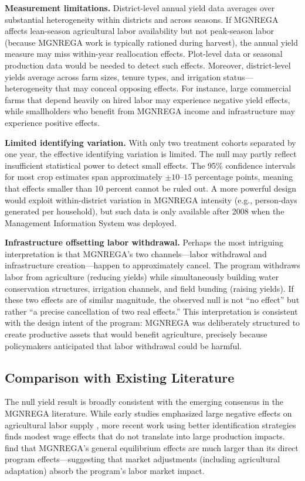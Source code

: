 \documentclass[12pt]{article}
\begin{document}
\textbf{Measurement limitations.} District-level annual yield data averages over substantial heterogeneity within districts and across seasons. If MGNREGA affects lean-season agricultural labor availability but not peak-season labor (because MGNREGA work is typically rationed during harvest), the annual yield measure may miss within-year reallocation effects. Plot-level data or seasonal production data would be needed to detect such effects. Moreover, district-level yields average across farm sizes, tenure types, and irrigation status---heterogeneity that may conceal opposing effects. For instance, large commercial farms that depend heavily on hired labor may experience negative yield effects, while smallholders who benefit from MGNREGA income and infrastructure may experience positive effects.

\textbf{Limited identifying variation.} With only two treatment cohorts separated by one year, the effective identifying variation is limited. The null may partly reflect insufficient statistical power to detect small effects. The 95\% confidence intervals for most crop estimates span approximately $\pm 10$--$15$ percentage points, meaning that effects smaller than 10 percent cannot be ruled out. A more powerful design would exploit within-district variation in MGNREGA intensity (e.g., person-days generated per household), but such data is only available after 2008 when the Management Information System was deployed.

\textbf{Infrastructure offsetting labor withdrawal.} Perhaps the most intriguing interpretation is that MGNREGA's two channels---labor withdrawal and infrastructure creation---happen to approximately cancel. The program withdraws labor from agriculture (reducing yields) while simultaneously building water conservation structures, irrigation channels, and field bunding (raising yields). If these two effects are of similar magnitude, the observed null is not ``no effect'' but rather ``a precise cancellation of two real effects.'' This interpretation is consistent with the design intent of the program: MGNREGA was deliberately structured to create productive assets that would benefit agriculture, precisely because policymakers anticipated that labor withdrawal could be harmful.

\subsection{Comparison with Existing Literature}

The null yield result is broadly consistent with the emerging consensus in the MGNREGA literature. While early studies emphasized large negative effects on agricultural labor supply \citep{azam2012impact}, more recent work using better identification strategies finds modest wage effects that do not translate into large production impacts. \citet{muralidharan2017general} find that MGNREGA's general equilibrium effects are much larger than its direct program effects---suggesting that market adjustments (including agricultural adaptation) absorb the program's labor market impact.
\end{document}
